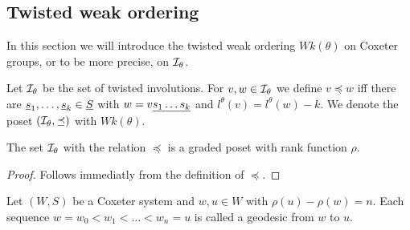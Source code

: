 \subsection{Twisted weak ordering}
\label{sec:twisted-involutions-twisted-weak-ordering}

In this section we will introduce the twisted weak ordering $Wk(\theta)$ on Coxeter groups, or to be more precise, on $\mathcal{I}_{\theta}$.

\begin{defi}
	Let $\mathcal{I}_{\theta}$ be the set of twisted involutions. For $v,w \in \mathcal{I}_{\theta}$ we define $v \preceq w$ iff there are $\underline{s}_1, \ldots, \underline{s}_k \in \underline{S}$ with $w = v \underline{ s_1 \ldots s_k }$ and $l^\theta(v) = l^\theta(w) - k$. We denote the poset $(\mathcal{I}_{\theta},\preceq)$ with $Wk(\theta)$.
\end{defi}

\begin{lemm}
	The set $\mathcal{I}_{\theta}$ with the relation $\preceq$ is a graded poset with rank function $\rho$.

	\begin{proof}
		Follows immediatly from the definition of $\preceq$.
	\end{proof}
\end{lemm}

\begin{defi}[Geodesic]
	Let $(W,S)$ be a Coxeter system and $w,u \in W$ with $\rho(u) - \rho(w) = n$. Each sequence $w = w_0 < w_1 < \ldots < w_n = u$ is called a geodesic from $w$ to $u$.
\end{defi}

\todo